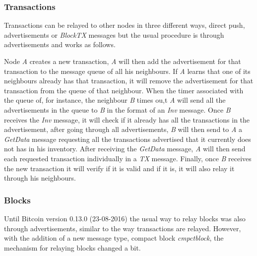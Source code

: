 \subsubsection*{Transactions}
Transactions can be relayed to other nodes in three different ways, direct push, advertisements or \textit{BlockTX} messages but the usual procedure is through advertisements and works as follows.

Node \textit{A} creates a new transaction, \textit{A} will then add the advertisement for that transaction to the message queue of all his neighbours. If \textit{A} learns that one of its neighbours already has that transaction, it will remove the advertisement for that transaction from the queue of that neighbour. When the timer associated with the queue of, for instance, the neighbour \textit{B} times ou,t \textit{A} will send all the advertisements in the queue to \textit{B} in the format of an \textit{Inv} message. Once \textit{B} receives the \textit{Inv} message, it will check if it already has all the transactions in the advertisement, after going through all advertisements, \textit{B} will then send to \textit{A} a \textit{GetData} message requesting all the transactions advertised that it currently does not has in his inventory. After receiving the \textit{GetData} message, \textit{A} will then send each requested transaction individually in a \textit{TX} message. Finally, once \textit{B} receives the new transaction it will verify if it is valid and if it is, it will also relay it through his neighbours.



\subsubsection*{Blocks}
Until Bitcoin version 0.13.0 (23-08-2016) the usual way to relay blocks was also through advertisements, similar to the way transactions are relayed. However, with the addition of a new message type, compact block \textit{cmpctblock}, the mechanism for relaying blocks changed a bit.

